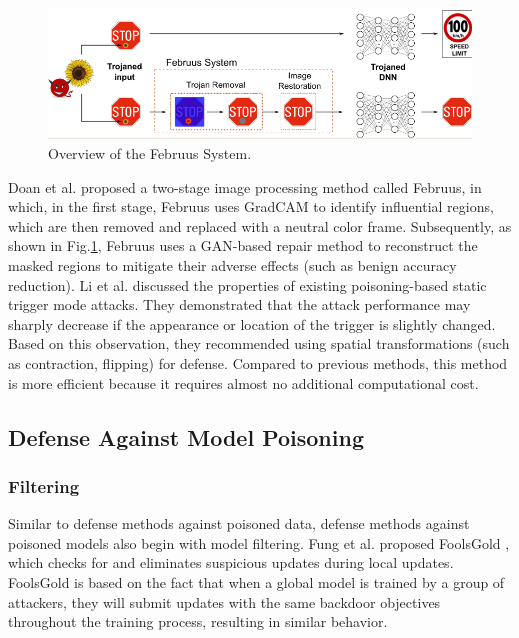 \documentclass[conference]{IEEEtran}
\begin{document}
\begin{figure}[htbp]
    \centerline{\includegraphics[width=0.8\linewidth,height=0.6\linewidth]{picture/f9.png}}
    \caption{Overview of the Februus System.}
    \label{fig10}
\end{figure}
Doan et al. \cite{b76}proposed a two-stage image processing method called Februus, in which,
in the first stage, Februus uses GradCAM to identify influential regions, which are then
removed and replaced with a neutral color frame. Subsequently, as shown in Fig.\ref{fig10}, Februus uses a GAN-based
repair method to reconstruct the masked regions to mitigate their adverse effects (such as benign accuracy reduction).
Li et al. \cite{b77} discussed the properties of existing poisoning-based static trigger mode attacks. They demonstrated
that the attack performance may sharply decrease if the appearance or location of the trigger is slightly changed.
Based on this observation, they recommended using spatial transformations (such as contraction, flipping)
for defense. Compared to previous methods, this method is more efficient because it requires almost no additional computational cost.

\subsection{Defense Against Model Poisoning}
\subsubsection{Filtering}
Similar to defense methods against poisoned data, defense methods against poisoned models also begin with model filtering.
Fung et al. proposed FoolsGold \cite{b78}, which checks for and eliminates suspicious updates during local updates.
FoolsGold is based on the fact that when a global model is trained by a group of attackers, they will submit updates with
the same backdoor objectives throughout the training process, resulting in similar behavior.
\end{document}
